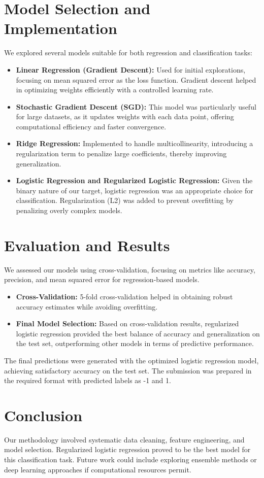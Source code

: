 \documentclass{article}
\begin{document}
\section{Model Selection and Implementation}
We explored several models suitable for both regression and classification tasks:
\begin{itemize}
    \item \textbf{Linear Regression (Gradient Descent):} Used for initial explorations, focusing on mean squared error as the loss function. Gradient descent helped in optimizing weights efficiently with a controlled learning rate.
    \item \textbf{Stochastic Gradient Descent (SGD):} This model was particularly useful for large datasets, as it updates weights with each data point, offering computational efficiency and faster convergence.
    \item \textbf{Ridge Regression:} Implemented to handle multicollinearity, introducing a regularization term to penalize large coefficients, thereby improving generalization.
    \item \textbf{Logistic Regression and Regularized Logistic Regression:} Given the binary nature of our target, logistic regression was an appropriate choice for classification. Regularization (L2) was added to prevent overfitting by penalizing overly complex models.
\end{itemize}

\section{Evaluation and Results}
We assessed our models using cross-validation, focusing on metrics like accuracy, precision, and mean squared error for regression-based models. 
\begin{itemize}
    \item \textbf{Cross-Validation:} 5-fold cross-validation helped in obtaining robust accuracy estimates while avoiding overfitting.
    \item \textbf{Final Model Selection:} Based on cross-validation results, regularized logistic regression provided the best balance of accuracy and generalization on the test set, outperforming other models in terms of predictive performance.
\end{itemize}

The final predictions were generated with the optimized logistic regression model, achieving satisfactory accuracy on the test set. The submission was prepared in the required format with predicted labels as -1 and 1.

\section{Conclusion}
Our methodology involved systematic data cleaning, feature engineering, and model selection. Regularized logistic regression proved to be the best model for this classification task. Future work could include exploring ensemble methods or deep learning approaches if computational resources permit.
\end{document}
